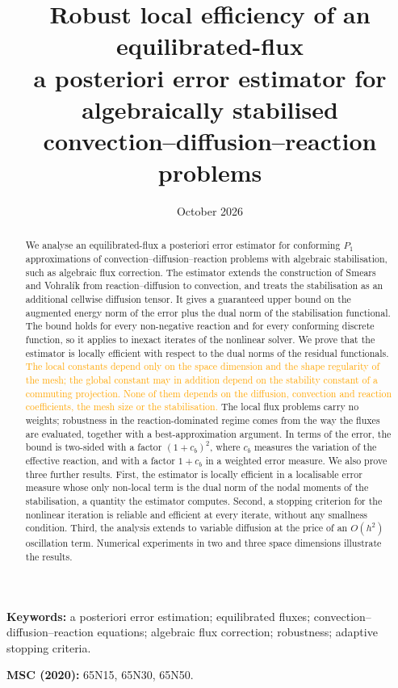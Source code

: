 \documentclass[11pt]{article}
\title{Robust local efficiency of an equilibrated-flux\\ a posteriori error estimator
for algebraically stabilised\\ convection--diffusion--reaction problems}
\author{}
\date{October 2026}
\newcommand{\refe}[1]{\textcolor{orange}{#1}}   %
\theoremstyle{plain}
\theoremstyle{remark}
\numberwithin{equation}{section}
\begin{document}
\maketitle

\begin{abstract}
We analyse an equilibrated-flux a posteriori error estimator for conforming $P_1$ approximations of
convection--diffusion--reaction problems with algebraic stabilisation, such as algebraic flux
correction. The estimator extends the construction of Smears and Vohral\'ik from reaction--diffusion to
convection, and treats the stabilisation as an additional cellwise diffusion tensor. It gives a
guaranteed upper bound on the augmented energy norm of the error plus the dual norm of the
stabilisation functional. The bound holds for every non-negative reaction and for every conforming
discrete function, so it applies to inexact iterates of the nonlinear solver. We prove that the
estimator is locally efficient with respect to the dual norms of the residual functionals. \refe{The
local constants depend only on the space dimension and the shape regularity of the mesh; the global
constant may in addition depend on the stability constant of a commuting projection. None of them
depends on the diffusion, convection and reaction coefficients, the mesh size or the stabilisation.} The local
flux problems carry no weights; robustness in the reaction-dominated regime comes from the way the
fluxes are evaluated, together with a best-approximation argument. In terms of the error, the bound is
two-sided with a factor $(1+c_b)^2$, where $c_b$ measures the variation of the effective reaction, and
with a factor $1+c_b$ in a weighted error measure. We also prove three further results. First, the
estimator is locally efficient in a localisable error measure whose only non-local term is the dual
norm of the nodal moments of the stabilisation, a quantity the estimator computes. Second, a stopping
criterion for the nonlinear iteration is reliable and efficient at every iterate, without any
smallness condition. Third, the analysis extends to variable diffusion at the price of an
$O(h^2)$ oscillation term. Numerical experiments in two and three space dimensions illustrate the
results.
\end{abstract}

\noindent\textbf{Keywords:} a posteriori error estimation; equilibrated fluxes;
convection--diffusion--reaction equations; algebraic flux correction; robustness; adaptive stopping
criteria.

\noindent\textbf{MSC (2020):} 65N15, 65N30, 65N50.
\end{document}
